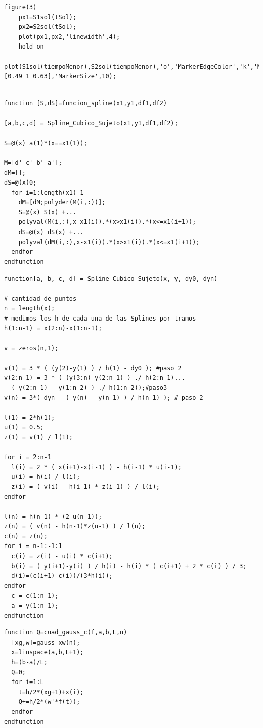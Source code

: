 \documentclass[11pt]{article}
\begin{document}
\begin{lstlisting}[caption=Entregable3.m]
	figure(3)
	px1=S1sol(tSol);
	px2=S2sol(tSol);
	plot(px1,px2,'linewidth',4);
	hold on
	plot(S1sol(tiempoMenor),S2sol(tiempoMenor),'o','MarkerEdgeColor','k','MarkerFaceColor',[0.49 1 0.63],'MarkerSize',10);
	
\end{lstlisting}

\begin{lstlisting}[caption=funcion$\_$spline.m]
function [S,dS]=funcion_spline(x1,y1,df1,df2)

[a,b,c,d] = Spline_Cubico_Sujeto(x1,y1,df1,df2);

S=@(x) a(1)*(x==x1(1));

M=[d' c' b' a'];
dM=[];
dS=@(x)0;
  for i=1:length(x1)-1
    dM=[dM;polyder(M(i,:))];
    S=@(x) S(x) +...
    polyval(M(i,:),x-x1(i)).*(x>x1(i)).*(x<=x1(i+1));
    dS=@(x) dS(x) +...
    polyval(dM(i,:),x-x1(i)).*(x>x1(i)).*(x<=x1(i+1));
  endfor
endfunction
\end{lstlisting}
\begin{lstlisting}[caption=Spline$\_$Cubico$\_$Sujeto.m]
function[a, b, c, d] = Spline_Cubico_Sujeto(x, y, dy0, dyn)
 
# cantidad de puntos
n = length(x);
# medimos los h de cada una de las Splines por tramos
h(1:n-1) = x(2:n)-x(1:n-1);

v = zeros(n,1);

v(1) = 3 * ( (y(2)-y(1) ) / h(1) - dy0 ); #paso 2
v(2:n-1) = 3 * ( (y(3:n)-y(2:n-1) ) ./ h(2:n-1)...
 -( y(2:n-1) - y(1:n-2) ) ./ h(1:n-2));#paso3 
v(n) = 3*( dyn - ( y(n) - y(n-1) ) / h(n-1) ); # paso 2

l(1) = 2*h(1); 
u(1) = 0.5;
z(1) = v(1) / l(1);

for i = 2:n-1
  l(i) = 2 * ( x(i+1)-x(i-1) ) - h(i-1) * u(i-1);
  u(i) = h(i) / l(i);
  z(i) = ( v(i) - h(i-1) * z(i-1) ) / l(i);
endfor

l(n) = h(n-1) * (2-u(n-1));
z(n) = ( v(n) - h(n-1)*z(n-1) ) / l(n);
c(n) = z(n);
for i = n-1:-1:1
  c(i) = z(i) - u(i) * c(i+1);
  b(i) = ( y(i+1)-y(i) ) / h(i) - h(i) * ( c(i+1) + 2 * c(i) ) / 3;
  d(i)=(c(i+1)-c(i))/(3*h(i));
endfor
  c = c(1:n-1);
  a = y(1:n-1);
endfunction
\end{lstlisting}

\begin{lstlisting}[caption=cuad$\_$gauss$\_$c.m]
function Q=cuad_gauss_c(f,a,b,L,n)
  [xg,w]=gauss_xw(n);
  x=linspace(a,b,L+1);
  h=(b-a)/L;
  Q=0;
  for i=1:L
    t=h/2*(xg+1)+x(i);
    Q+=h/2*(w'*f(t));
  endfor
endfunction
\end{lstlisting}
\end{document}
